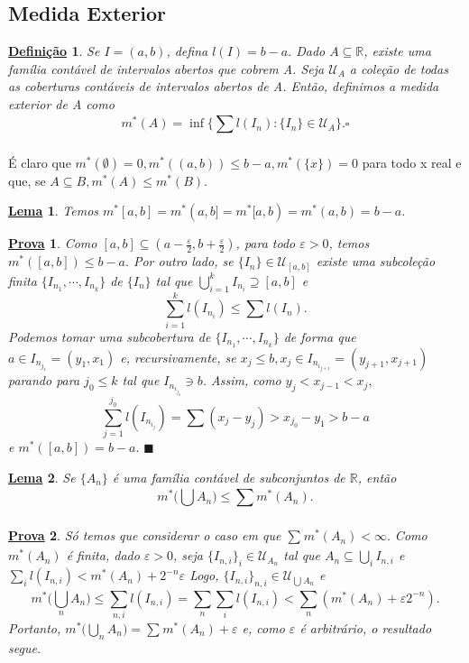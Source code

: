 \documentclass{article}
\newtheorem*{def*}{\underline{Defini\c c\~ao}}
\newtheorem*{lemma*}{\underline{Lema}}
\newtheorem*{proof*}{\underline{Prova}}
\renewcommand\qedsymbol{$\blacksquare$}
\begin{document}
\subsection{Medida Exterior}
\begin{def*}
  Se \(I=(a, b)\), defina \(l(I) = b-a.\) Dado \(A\subseteq{\mathbb{R}}\), existe
  uma família contável de intervalos abertos que cobrem A. Seja \(\mathcal{U}_{A}\)
  a cole\c cão de todas as coberturas contáveis de intervalos abertos de A. Então,
  definimos a medida exterior de A como 
    \[
      m^{*}(A) = \inf\{\sum\limits_{}^{}l(I_{n}):\{I_{n}\}\in \mathcal{U}_{A}\}.\square
    \]
\end{def*}
  É claro que \(m^{*}(\emptyset) = 0, m^{*}((a, b))\leq b-a, m^{*}(\{x\}) = 0\) para todo
  x real e que, se \(A\subseteq{B}, m^{*}(A)\leq m^{*}(B).\)
 \begin{lemma*}
   Temos \(m^{*}[a, b]=m^{*}(a, b]=m^{*}[a, b)=m^{*}(a, b) = b-a.\)
 \end{lemma*}
\begin{proof*}
  Como \([a, b]\subseteq{(a-\frac{\varepsilon }{2}, b+\frac{\varepsilon }{2})}\), para todo \(\varepsilon >0\), temos
  \(m^{*}([a, b])\leq b-a.\) Por outro lado, se \(\{I_{n}\}\in \mathcal{U}_{[a, b]}\) existe
  uma subcole\c cão finita \(\{I_{n_{1}}, \cdots, I_{n_{k}}\}\) de \(\{I_{n}\}\) tal que
  \(\bigcup_{i=1}^{k}{I_{n_{i}}}\supseteq{[a, b]}\) e 
    \[
      \sum\limits_{i=1}^{k}l(I_{n_{i}})\leq \sum\limits_{}^{}l(I_{n}).
    \]
    Podemos tomar uma subcobertura de \(\{I_{n_{1}}, \cdots, I_{n_{k}}\}\) de forma que
    \(a\in I_{n_{j_{1}}} = (y_{1}, x_{1})\) e, recursivamente, se \(x_{j}\leq b, x_{j}\in I_{n_{i_{j+1}}} = (y_{j+1},x_{j+1})\)
    parando para \(j_{0}\leq k\) tal que \(I_{n_{i_{j_{0}}}}\ni b\). Assim, como
    \(y_{j} < x_{j-1} < x_{j},\) 
      \[
        \sum\limits_{j=1}^{j_{0}}l(I_{n_{i_{j}}}) = \sum\limits_{}^{}(x_{j} - y_{j}) > x_{j_{0}} - y_{1} > b - a
      \]
      e \(m^{*}([a, b]) = b-a.\) \qedsymbol
\end{proof*}
 \begin{lemma*}
   Se \(\{A_{n}\}\) é uma família contável de subconjuntos de \(\mathbb{R}\), então 
     \[
       m^{*}\biggl(\bigcup_{}^{}{A_{n}}\biggr)\leq \sum\limits_{}^{}m^{*}(A_{n}).
     \]
 \end{lemma*}
\begin{proof*}
  Só temos que considerar o caso em que \(\sum\limits_{}^{}m^{*}(A_{n}) < \infty.\) Como
  \(m^{*}(A_{n})\) é finita, dado \(\varepsilon  > 0\), seja \(\{I_{n, i}\}_{i}\in \mathcal{U}_{A_{n}}\) tal que
  \(A_{n}\subseteq{\bigcup_{i}^{}{I_{n, i}}}\) e \(\sum\limits_{i}^{}l(I_{n, i}) < m^{*}(A_{n}) + 2^{-n}\varepsilon\)
  Logo, \(\{I_{n, i}\}_{n, i}\in \mathcal{U}_{\bigcup_{}^{}{A_{n}}}\) e 
    \[
      m^{*}\biggl(\bigcup_{n}^{}{A_{n}}\biggr)\leq \sum\limits_{n, i}^{}l(I_{n, i}) = \sum\limits_{n}^{}\sum\limits_{i}^{}l(I_{n, i}) < \sum\limits_{n}^{}(m^{*}(A_{n}) + \varepsilon 2^{-n}).
    \]
  Portanto, \(m^{*}\biggl(\bigcup_{n}^{}{A_{n}}\biggr) = \sum\limits_{}^{}m^{*}(A_{n}) + \varepsilon\) e, como \(\varepsilon \) é arbitrário, o resultado segue.
\end{proof*}
\end{document}
